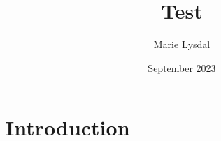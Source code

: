 \documentclass{article}
\title{Test}
\author{Marie Lysdal}
\date{September 2023}
\begin{document}
\maketitle
\newpage
\section{Introduction}
\end{document}
